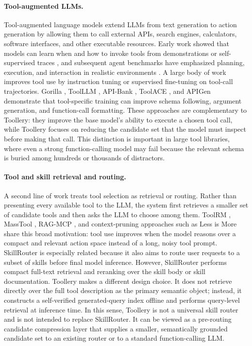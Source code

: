 \documentclass[11pt]{article}
\begin{document}
\paragraph{Tool-augmented LLMs.}
Tool-augmented language models extend LLMs from text generation to action generation by allowing them to call external APIs, search engines, calculators, software interfaces, and other executable resources. Early work showed that models can learn when and how to invoke tools from demonstrations or self-supervised traces \citep{schick2023toolformer, yao2022react}, and subsequent agent benchmarks have emphasized planning, execution, and interaction in realistic environments \citep{yao2022webshop, huang2024planning}. A large body of work improves tool use by instruction tuning or supervised fine-tuning on tool-call trajectories. Gorilla \citep{patil2024gorilla}, ToolLLM \citep{qin2023toolllm}, API-Bank \citep{li-etal-2023-api}, ToolACE \citep{liu2024toolace}, and APIGen \citep{liu2024apigen} demonstrate that tool-specific training can improve schema following, argument generation, and function-call formatting. These approaches are complementary to Toollery: they improve the base model's ability to execute a chosen tool call, while Toollery focuses on reducing the candidate set that the model must inspect before making that call. This distinction is important in large tool libraries, where even a strong function-calling model may fail because the relevant schema is buried among hundreds or thousands of distractors.

\paragraph{Tool and skill retrieval and routing.}
A second line of work treats tool selection as retrieval or routing. Rather than presenting every available tool to the LLM, the system first retrieves a smaller set of candidate tools and then asks the LLM to choose among them. ToolRM \citep{agarwal2025toolrm}, MassTool \citep{lin2025masstool}, RAG-MCP \citep{gan2025rag}, and context-pruning approaches such as Less is More \citep{paramanayakam2025less} share this broad motivation: tool use improves when the model reasons over a compact and relevant action space instead of a long, noisy tool prompt. SkillRouter is especially related because it also aims to route user requests to a subset of skills before final model inference. However, SkillRouter performs compact full-text retrieval and reranking over the skill body or skill documentation. Toollery makes a different design choice. It does not retrieve directly over the full tool description as the primary semantic object; instead, it constructs a self-verified generated-query index offline and performs query-level retrieval at inference time. In this sense, Toollery is not a universal skill router and is not intended to replace SkillRouter. It can be viewed as a pre-routing candidate compression layer that supplies a smaller, semantically grounded candidate set to an existing router or to a standard function-calling LLM.
\end{document}
